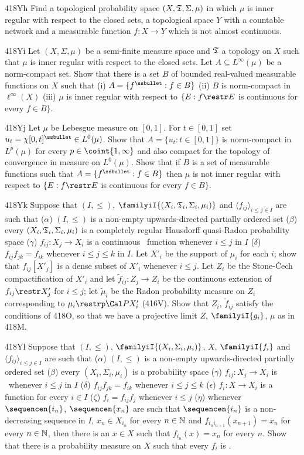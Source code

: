 {\spheader 418Yh Find a topological probability space
$(X,\frak T,\Sigma,\mu)$ in which $\mu$ is inner regular with respect to
the closed sets, a topological space $Y$ with a countable network and a
measurable function $f:X\to Y$ which is not almost continuous.

\spheader 418Yi Let $(X,\Sigma,\mu)$ be a semi-finite measure space and
$\frak T$ a topology on $X$ such that $\mu$ is inner regular with
respect to the closed sets.   Let $A\subseteq L^{\infty}(\mu)$ be a
norm-compact set.   Show that there is a set $B$ of bounded real-valued
measurable functions on $X$ such that (i) $A=\{f^{\ssbullet}:f\in B\}$
(ii) $B$ is norm-compact in $\ell^{\infty}(X)$ (iii) $\mu$ is inner
regular with respect to
$\{E:f\restr E$ is continuous for every $f\in B\}$.

\spheader 418Yj Let $\mu$ be Lebesgue measure on $[0,1]$.   For
$t\in[0,1]$ set $u_t=\chi[0,t]^{\ssbullet}\in L^0(\mu)$.   Show that
$A=\{u_t:t\in[0,1]\}$ is norm-compact in $L^p(\mu)$ for every
$p\in\coint{1,\infty}$ and also compact for the topology of convergence
in measure on $L^0(\mu)$.   Show that if $B$ is a set of measurable
functions such that $A=\{f^{\ssbullet}:f\in B\}$ then $\mu$ is not inner
regular with respect to
$\{E:f\restr E$ is continuous for every $f\in B\}$.

\spheader 418Yk Suppose that $(I,\le)$,
$\familyiI{(X_i,\frak T_i,\Sigma_i,\mu_i)}$ and
$\langle f_{ij}\rangle_{i\le j\in I}$ are such that
($\alpha$) $(I,\le)$ is a non-empty upwards-directed partially ordered
set ($\beta$) every $(X_i,\frak T_i,\Sigma_i,\mu_i)$ is a completely
regular Hausdorff quasi-Radon probability space
($\gamma$) $f_{ij}:X_j\to X_i$ is a
continuous \imp\ function whenever $i\le j$ in $I$
($\delta$) $f_{ij}f_{jk}=f_{ik}$ whenever $i\le j\le k$ in $I$.
Let $X'_i$ be the
support of $\mu_i$ for each $i$;  show that $f_{ij}[X'_j]$ is a dense
subset of $X'_i$ whenever $i\le j$.   Let $Z_i$ be the Stone-\v{C}ech
compactification of $X'_i$ and let $\tilde f_{ij}:Z_j\to Z_i$ be the
continuous extension of $f_{ij}\restr X'_j$ for $i\le j$;  let
$\tilde\mu_i$ be the Radon probability measure on $Z_i$ corresponding to
$\mu_i\restrp\Cal PX'_i$ (416V).   Show that $Z_i$, $\tilde f_{ij}$
satisfy the conditions of 418O, so that we have a projective limit $Z$,
$\familyiI{g_i}$, $\mu$ as in 418M.

\spheader 418Yl Suppose that $(I,\le)$,
$\familyiI{(X_i,\Sigma_i,\mu_i)}$, $X$, $\familyiI{f_i}$ and
$\langle f_{ij}\rangle_{i\le j\in I}$ are such that
($\alpha$) $(I,\le)$ is a non-empty upwards-directed partially ordered
set ($\beta$) every $(X_i,\Sigma_i,\mu_i)$ is a probability space
($\gamma$) $f_{ij}:X_j\to X_i$ is \imp\ whenever $i\le j$ in $I$
($\delta$) $f_{ij}f_{jk}=f_{ik}$ whenever $i\le j\le k$ ($\epsilon$)
$f_i:X\to X_i$ is a function for every $i\in I$ ($\zeta$)
$f_i=f_{ij}f_j$ whenever $i\le j$ ($\eta$) whenever $\sequencen{i_n}$,
$\sequencen{x_n}$ are such that $\sequencen{i_n}$ is a non-decreasing
sequence in $I$, $x_n\in X_{i_n}$ for every $n\in\Bbb N$ and
$f_{i_ni_{n+1}}(x_{n+1})=x_n$ for every $n\in\Bbb N$, then there is an
$x\in X$ such that $f_{i_n}(x)=x_n$ for every $n$.   Show that there is
a probability measure on $X$ such that every $f_i$ is \imp.

}
